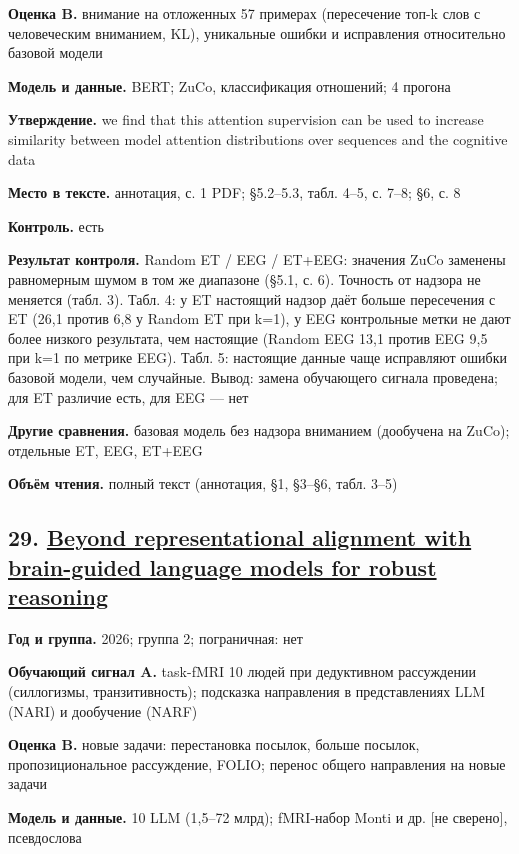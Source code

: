 \textbf{Оценка B.} внимание на отложенных 57 примерах (пересечение топ-k слов с человеческим вниманием, KL), уникальные ошибки и исправления относительно базовой модели

\textbf{Модель и данные.} BERT; ZuCo, классификация отношений; 4 прогона

\textbf{Утверждение.} we find that this attention supervision can be used to increase similarity between model attention distributions over sequences and the cognitive data

\textbf{Место в тексте.} аннотация, с. 1 PDF; §5.2–5.3, табл. 4–5, с. 7–8; §6, с. 8

\textbf{Контроль.} есть

\textbf{Результат контроля.} Random ET / EEG / ET+EEG: значения ZuCo заменены равномерным шумом в том же диапазоне (§5.1, с. 6). Точность от надзора не меняется (табл. 3). Табл. 4: у ET настоящий надзор даёт больше пересечения с ET (26,1 против 6,8 у Random ET при k=1), у EEG контрольные метки не дают более низкого результата, чем настоящие (Random EEG 13,1 против EEG 9,5 при k=1 по метрике EEG). Табл. 5: настоящие данные чаще исправляют ошибки базовой модели, чем случайные. Вывод: замена обучающего сигнала проведена; для ET различие есть, для EEG — нет

\textbf{Другие сравнения.} базовая модель без надзора вниманием (дообучена на ZuCo); отдельные ET, EEG, ET+EEG

\textbf{Объём чтения.} полный текст (аннотация, §1, §3–§6, табл. 3–5)


\subsection*{29. \href{https://doi.org/10.1038/s42256-026-01278-w}{Beyond representational alignment with brain-guided language models for robust reasoning}}

\textbf{Год и группа.} 2026; группа 2; пограничная: нет

\textbf{Обучающий сигнал A.} task-fMRI 10 людей при дедуктивном рассуждении (силлогизмы, транзитивность); подсказка направления в представлениях LLM (NARI) и дообучение (NARF)

\textbf{Оценка B.} новые задачи: перестановка посылок, больше посылок, пропозициональное рассуждение, FOLIO; перенос общего направления на новые задачи

\textbf{Модель и данные.} 10 LLM (1,5–72 млрд); fMRI-набор Monti и др. [не сверено], псевдослова

